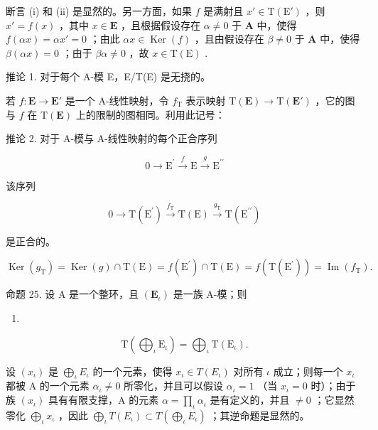 断言 (i) 和 (ii) 是显然的。另一方面，如果 \(f\) 是满射且 \(x' \in \mathrm{T}(\mathrm{E}')\) ，则 \(x' = f(x)\) ，其中 \(x \in \mathbf{E}\) ，且根据假设存在 \(\alpha \neq 0\) 于 \(\mathbf{A}\) 中，使得 \(f(\alpha x) = \alpha x' = 0\) ；由此 \(\alpha x \in \operatorname{Ker}(f)\) ，且由假设存在 \(\beta \neq 0\) 于 \(\mathbf{A}\) 中，使得 \(\beta(\alpha x) = 0\) ；由于 \(\beta \alpha \neq 0\) ，故 \(x \in \mathrm{T}(\mathrm{E})\) .

推论 1. 对于每个 A-模 E，E/T(E) 是无挠的。

若 \(f: \mathbf{E} \to \mathbf{E}'\) 是一个 A-线性映射，令 \(f_{\mathrm{T}}\) 表示映射 \(\mathrm{T}(\mathbf{E}) \to \mathrm{T}(\mathbf{E}')\) ，它的图与 \(f\) 在 \(\mathrm{T}(\mathbf{E})\) 上的限制的图相同。利用此记号：

推论 2. 对于 A-模与 A-线性映射的每个正合序列

\[
0 \longrightarrow \mathrm{E} ^ {\prime} \stackrel {f} {\longrightarrow} \mathrm{E} \stackrel {g} {\longrightarrow} \mathrm{E} ^ {\prime \prime}
\]

该序列

\[
0 \longrightarrow \mathrm{T} (\mathrm{E} ^ {\prime}) \xrightarrow {f _ {\mathrm{T}}} \mathrm{T} (\mathrm{E}) \xrightarrow {g _ {\mathrm{T}}} \mathrm{T} (\mathrm{E} ^ {\prime \prime})
\]

是正合的。

\[
\operatorname{Ker} \left(g _ {\mathrm{T}}\right) = \operatorname{Ker} (g) \cap \mathrm{T} (\mathrm{E}) = f \left(\mathrm{E} ^ {\prime}\right) \cap \mathrm{T} (\mathrm{E}) = f \left(\mathrm{T} \left(\mathrm{E} ^ {\prime}\right)\right) = \operatorname{Im} \left(f _ {\mathrm{T}}\right).
\]

命题 25. 设 A 是一个整环，且 \((\mathbf{E}_{\iota})\) 是一族 A-模；则

\begin{enumerate}
\def\labelenumi{(\arabic{enumi})}
\setcounter{enumi}{36}
\tightlist
\item
\end{enumerate}

\[
\mathrm{T} \left(\bigoplus_ {\iota} \mathrm{E} _ {\iota}\right) = \bigoplus_ {\iota} \mathrm{T} (\mathrm{E} _ {\iota}).
\]

设 \((x_{\iota})\) 是 \(\bigoplus_{\iota} E_{\iota}\) 的一个元素，使得 \(x_{\iota} \in T(E_{\iota})\) 对所有 \(\iota\) 成立；则每一个 \(x_{\iota}\) 都被 A 的一个元素 \(\alpha_{\iota} \neq 0\) 所零化，并且可以假设 \(\alpha_{\iota} = 1\) （当 \(x_{\iota} = 0\) 时）；由于族 \((x_{\iota})\) 具有有限支撑，A 的元素 \(\alpha = \prod_{\iota} \alpha_{\iota}\) 是有定义的，并且 \(\neq 0\) ；它显然零化 \(\bigoplus_{\iota} x_{\iota}\) ，因此 \(\bigoplus_{\iota} T(E_{\iota}) \subset T\left(\bigoplus_{\iota} E_{\iota}\right)\) ；其逆命题是显然的。

